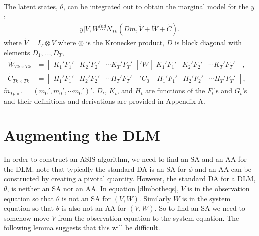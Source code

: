 \documentclass[12pt]{article}
\begin{document}
The latent states, $\theta$, can be integrated out to obtain the marginal model for the $y$: \vspace{-.3cm}
\begin{align}
  y|V,W \stackrel{ind}{\sim} N_{Tk}(D\tilde{m}, \tilde{V} + \tilde{W} + \tilde{C}). \label{margmodel}
\end{align}
where $\tilde{V}=I_T\otimes V$ where $\otimes$ is the Kronecker product, $D$ is block diagonal with elements $D_1,\ldots,D_T$, \vspace{-.2cm}
\begin{align*}
\tilde{W}_{Tk\times Tk} &= \begin{bmatrix} K_1'F_1' & K_2'F_2' & \cdots K_T'F_T' \end{bmatrix}' W \begin{bmatrix} K_1'F_1' & K_2'F_2' & \cdots K_T'F_T' \end{bmatrix}, &\\
\tilde{C}_{Tk\times Tk} &= \begin{bmatrix} H_1'F_1' & H_2'F_2' & \cdots H_T'F_T' \end{bmatrix}' C_0 \begin{bmatrix} H_1'F_1' & H_2'F_2' & \cdots H_T'F_T' \end{bmatrix},&
\end{align*}
$\tilde{m}_{Tp\times 1} = (m_0', m_0', \cdots m_0')'$. $D_t$, $K_t$, and $H_t$ are functions of the $F_t$'s and $G_t$'s and their definitions and derivations are provided in Appendix A.



\section{Augmenting the DLM}\label{sec:DAs}

In order to construct an ASIS algorithm, we need to find an SA and an AA for the DLM. \citet{papaspiliopoulos2007general} note that typically the standard DA is an SA for $\phi$ and an AA can be constructed by creating a pivotal quantity. However, the standard DA for a DLM, $\theta$, is neither an SA nor an AA. In equation \eqref{dlmbotheqs}, $V$ is in the observation equation so that $\theta$ is not an SA for $(V,W)$. Similarly $W$ is in the system equation so that $\theta$ is also not an AA for $(V,W)$. So to find an SA we need to somehow move $V$ from the observation equation to the system equation. The following lemma suggests that this will be difficult.
\end{document}
